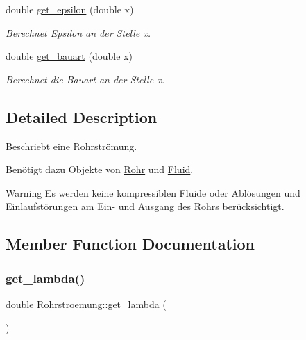 \begin{DoxyCompactItemize}
\mbox{\label{class_rohrstroemung_ab3a28b86a6a2d630a4c37f0054fb0288}} 
double \hyperlink{class_rohrstroemung_ab3a28b86a6a2d630a4c37f0054fb0288}{get\+\_\+epsilon} (double x)
\begin{DoxyCompactList}\small\item\em Berechnet Epsilon an der Stelle x. \end{DoxyCompactList}\item 
\mbox{\label{class_rohrstroemung_a17fccbf71ba0dc1635e3a06fdc740cf3}} 
double \hyperlink{class_rohrstroemung_a17fccbf71ba0dc1635e3a06fdc740cf3}{get\+\_\+bauart} (double x)
\begin{DoxyCompactList}\small\item\em Berechnet die Bauart an der Stelle x. \end{DoxyCompactList}\end{DoxyCompactItemize}


\subsection{Detailed Description}
Beschriebt eine Rohrströmung. 

Benötigt dazu Objekte von \hyperlink{class_rohr}{Rohr} und \hyperlink{class_fluid}{Fluid}.

\begin{DoxyWarning}{Warning}
Es werden keine kompressiblen Fluide oder Ablösungen und Einlaufstörungen am Ein-\/ und Ausgang des Rohrs berücksichtigt. 
\end{DoxyWarning}


\subsection{Member Function Documentation}
\mbox{\label{class_rohrstroemung_a7ea25aca94625ef68bf856d957419d26}} 
\subsubsection{\texorpdfstring{get\+\_\+lambda()}{get\_lambda()}}
{\footnotesize\ttfamily double Rohrstroemung\+::get\+\_\+lambda (\begin{DoxyParamCaption}{ }\end{DoxyParamCaption})}



